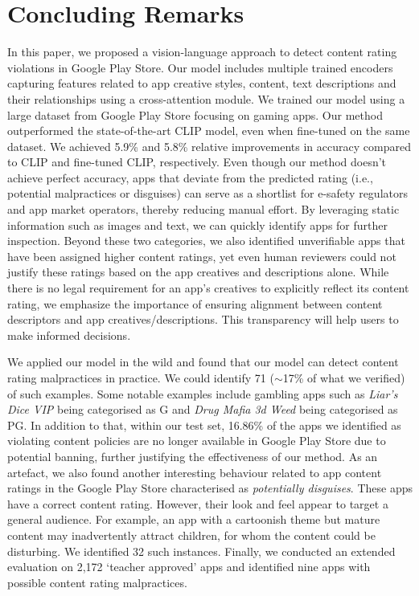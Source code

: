 \section{Concluding Remarks}

\label{Conclusion}

In this paper, we proposed a vision-language approach to detect content rating violations in Google Play Store. Our model includes multiple trained encoders capturing features related to app creative styles, content, text descriptions and their relationships using a cross-attention module. We trained our model using a large dataset from Google Play Store focusing on gaming apps. Our method outperformed the state-of-the-art CLIP model, even when fine-tuned on the same dataset. We achieved 5.9\% and 5.8\% relative improvements in accuracy compared to CLIP and fine-tuned CLIP, respectively. Even though our method doesn't achieve perfect accuracy, apps that deviate from the predicted rating (i.e., potential malpractices or disguises) can serve as a shortlist for e-safety regulators and app market operators, thereby reducing manual effort. By leveraging static information such as images and text, we can quickly identify apps for further inspection. Beyond these two categories, we also identified unverifiable apps that have been assigned higher content ratings, yet even human reviewers could not justify these ratings based on the app creatives and descriptions alone. While there is no legal requirement for an app’s creatives to explicitly reflect its content rating, we emphasize the importance of ensuring alignment between content descriptors and app creatives/descriptions. This transparency will help users to make informed decisions.


We applied our model in the wild and found that our model can detect content rating malpractices in practice. We could identify 71 ($\sim$17\% of what we verified) of such examples.
Some notable examples include gambling apps such as \emph{Liar's Dice VIP} being categorised as G and \emph{Drug Mafia 3d Weed} being categorised as PG. In addition to that, within our test set, 16.86\% of the apps we identified as violating content policies are no longer available in Google Play Store due to potential banning, further justifying the effectiveness of our method. As an artefact, we also found another interesting behaviour related to app content ratings in the Google Play Store characterised as \emph{potentially disguises}. These apps have a correct content rating. However, their look and feel appear to target a general audience. For example, an app with a cartoonish theme but mature content may inadvertently attract children, for whom the content could be disturbing. We identified 32 such instances. Finally, we conducted an extended evaluation on 2,172 `teacher approved' apps and identified nine apps with possible content rating malpractices. 


